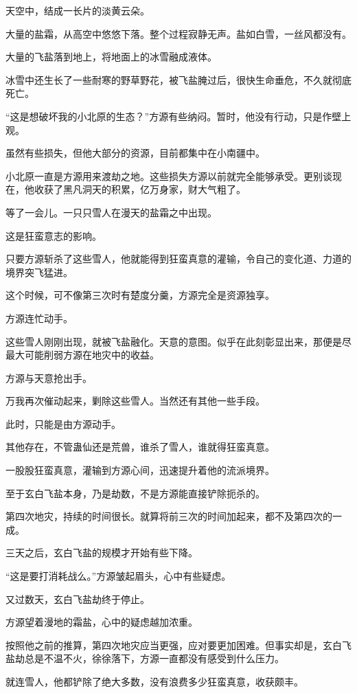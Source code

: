 \begin{this_body}
天空中，结成一长片的淡黄云朵。

大量的盐霜，从高空中悠悠下落。整个过程寂静无声。盐如白雪，一丝风都没有。

大量的飞盐落到地上，将地面上的冰雪融成液体。

冰雪中还生长了一些耐寒的野草野花，被飞盐腌过后，很快生命垂危，不久就彻底死亡。

“这是想破坏我的小北原的生态？”方源有些纳闷。暂时，他没有行动，只是作壁上观。

虽然有些损失，但他大部分的资源，目前都集中在小南疆中。

小北原一直是方源用来渡劫之地。这些损失方源以前就完全能够承受。更别谈现在，他收获了黑凡洞天的积累，亿万身家，财大气粗了。

等了一会儿。一只只雪人在漫天的盐霜之中出现。

这是狂蛮意志的影响。

只要方源斩杀了这些雪人，他就能得到狂蛮真意的灌输，令自己的变化道、力道的境界突飞猛进。

这个时候，可不像第三次时有楚度分羹，方源完全是资源独享。

方源连忙动手。

这些雪人刚刚出现，就被飞盐融化。天意的意图。似乎在此刻彰显出来，那便是尽最大可能削弱方源在地灾中的收益。

方源与天意抢出手。

万我再次催动起来，剿除这些雪人。当然还有其他一些手段。

此时，只能是由方源动手。

其他存在，不管蛊仙还是荒兽，谁杀了雪人，谁就得狂蛮真意。

一股股狂蛮真意，灌输到方源心间，迅速提升着他的流派境界。

至于玄白飞盐本身，乃是劫数，不是方源能直接铲除扼杀的。

第四次地灾，持续的时间很长。就算将前三次的时间加起来，都不及第四次的一成。

三天之后，玄白飞盐的规模才开始有些下降。

“这是要打消耗战么。”方源皱起眉头，心中有些疑虑。

又过数天，玄白飞盐劫终于停止。

方源望着漫地的霜盐，心中的疑虑越加浓重。

按照他之前的推算，第四次地灾应当更强，应对要更加困难。但事实却是，玄白飞盐劫总是不温不火，徐徐落下，方源一直都没有感受到什么压力。

就连雪人，他都铲除了绝大多数，没有浪费多少狂蛮真意，收获颇丰。


\end{this_body}
